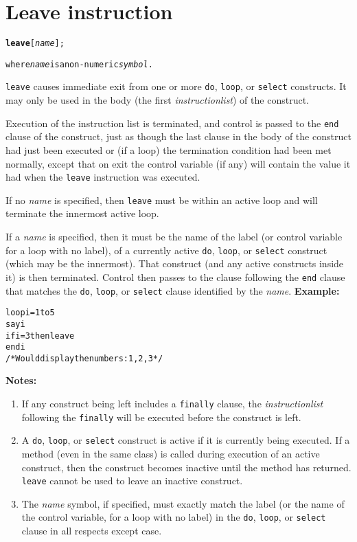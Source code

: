 \chapter{Leave instruction}\label{"id"}
\index{,}
\begin{shaded}
\begin{alltt}
\textbf{leave} [\emph{name}];

where \emph{name} is a non-numeric \emph{symbol}.
\end{alltt}
\end{shaded}
 \texttt{leave} causes immediate exit from one or more \texttt{do},
\texttt{loop}, or \texttt{select} constructs.
It may only be used in the body (the first \emph{instructionlist})
of the construct.
 
Execution of the instruction list is terminated, and control is
passed to the \texttt{end} clause of the construct, just as though the
last clause in the body of the construct had just been executed or (if
a loop) the termination condition had been met normally, except that on
exit the control variable (if any) will contain the value it had when
the \texttt{leave} instruction was executed.
 
If no \emph{name} is specified, then \texttt{leave} must be
within an active loop and will terminate the innermost active loop.
 
If a \emph{name} is specified, then it must be the name of the
label (or control variable for a loop with no label), of a currently
active \texttt{do}, \texttt{loop}, or \texttt{select} construct
(which may be the innermost).  That construct (and any active constructs
inside it) is then terminated.  Control then passes to the clause
following the \texttt{end} clause that matches the
\texttt{do}, \texttt{loop}, or \texttt{select} clause identified by the
\emph{name}.
 \textbf{Example:}
\begin{alltt}
loop i=1 to 5
  say i
  if i=3 then leave
  end i
/* Would display the numbers:  1, 2, 3  */
\end{alltt}
 \textbf{Notes:}
\begin{enumerate}
\item If any construct being left includes a \texttt{finally} clause, the
\emph{instructionlist} following the \texttt{finally} will be
executed before the construct is left.
\item 
A \texttt{do}, \texttt{loop}, or \texttt{select} construct
is active if it is currently being executed.
If a method (even in the same class) is called during execution of an
active construct, then the construct becomes inactive until the method
has returned.
\texttt{leave} cannot be used to leave an inactive construct.
\item The \emph{name} symbol, if specified, must exactly match the
label (or the name of the control variable, for a loop with no label) in
the \texttt{do}, \texttt{loop}, or \texttt{select} clause in all
respects except case.
\end{enumerate}
